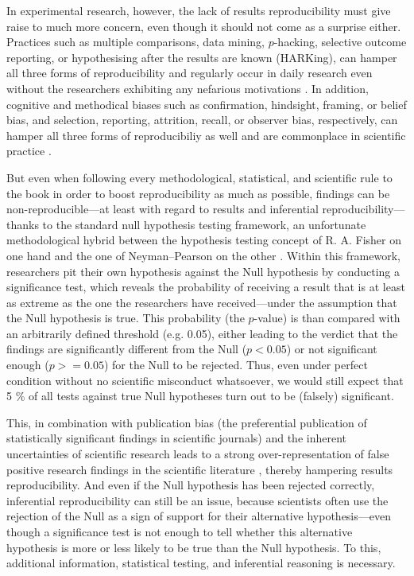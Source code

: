 \documentclass[11pt, a4paper,twoside]{report}\usepackage[]{graphicx}\usepackage[]{color}
\begin{document}
In experimental research, however, the lack of results reproducibility must give raise to much more concern, even though it should not come as a surprise either. Practices such as multiple comparisons, data mining, $p$-hacking, selective outcome reporting, or hypothesising after the results are known (HARKing), can hamper all three forms of reproducibility and regularly occur in daily research even without the researchers exhibiting any nefarious motivations \citep{goodman_what_2016}. In addition, cognitive and methodical biases such as confirmation, hindsight, framing, or belief bias, and selection, reporting, attrition, recall, or observer bias, respectively, can hamper all three forms of reproducibiliy as well and are commonplace in scientific practice \citep{munafo_manifesto_2017}.

But even when following every methodological, statistical, and scientific rule to the book in order to boost reproducibility as much as possible, findings can be non-reproducible---at least with regard to results and inferential reproducibility---thanks to the standard null hypothesis testing framework, an unfortunate methodological hybrid between the hypothesis testing concept of R. A. Fisher on one hand and the one of Neyman--Pearson on the other \citep{amrhein_earth_2017}. Within this framework, researchers pit their own hypothesis against the Null hypothesis by conducting a significance test, which reveals the probability of receiving a result that is at least as extreme as the one the researchers have received---under the assumption that the Null hypothesis is true. This probability (the $p$-value) is than compared with an arbitrarily defined threshold (e.g. 0.05), either leading to the verdict that the findings are significantly different from the Null ($p < 0.05$) or not significant enough ($p >= 0.05$) for the Null to be rejected. Thus, even under perfect condition without no scientific misconduct whatsoever, we would still expect that 5 \% of all tests against true Null hypotheses turn out to be (falsely) significant. 

This, in combination with publication bias (the preferential publication of statistically significant findings in scientific journals) and the inherent uncertainties of scientific research leads to a strong over-representation of false positive research findings in the scientific literature \citep{ioannidis_why_2005}, thereby hampering results reproducibility. And even if the Null hypothesis has been rejected correctly, inferential reproducibility can still be an issue, because scientists often use the rejection of the Null as a sign of support for their alternative hypothesis---even though a significance test is not enough to tell whether this alternative hypothesis is more or less likely to be true than the Null hypothesis. To this, additional information, statistical testing, and inferential reasoning is necessary.
\end{document}
